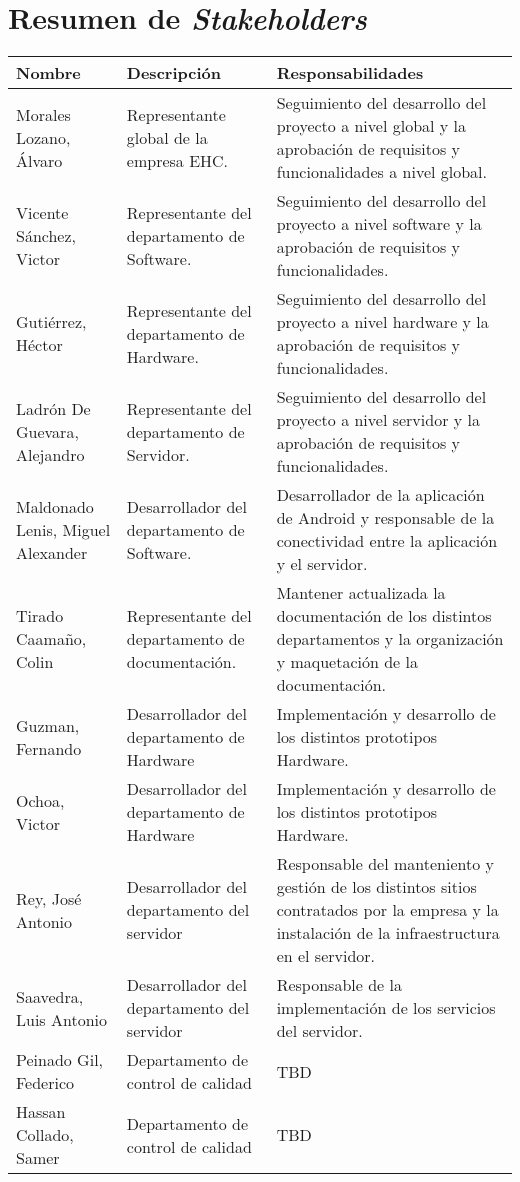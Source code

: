 \section{Resumen de \textit{Stakeholders}}
    \begin{tabular}{|p{4.5cm}|p{4cm}|p{8cm}|}
        \hline \textbf{Nombre} &  \textbf{Descripción} & \textbf{Responsabilidades} \\
        \hline Morales Lozano, Álvaro & Representante global de la empresa EHC. &
		Seguimiento del desarrollo del proyecto a nivel global y la aprobación de requisitos y funcionalidades a nivel global. \\
        \hline Vicente Sánchez, Victor & Representante del departamento de Software. &
        Seguimiento del desarrollo del proyecto a nivel software y la aprobación de requisitos y funcionalidades.\\
        \hline Gutiérrez, Héctor & Representante del departamento de Hardware. &
		Seguimiento del desarrollo del proyecto a nivel hardware y la aprobación de requisitos y funcionalidades. \\
        \hline Ladrón De Guevara, Alejandro & Representante del departamento de Servidor.&
        Seguimiento del desarrollo del proyecto a nivel servidor y la aprobación de requisitos y funcionalidades. \\
        \hline Maldonado Lenis, Miguel Alexander & Desarrollador del departamento de Software. &
		Desarrollador de la aplicación de Android y responsable de la conectividad entre la aplicación y el servidor. \\        
        \hline Tirado Caamaño, Colin & Representante del departamento de documentación. &
		Mantener actualizada la documentación de los distintos departamentos y la organización y maquetación de la documentación. \\  
        \hline Guzman, Fernando & Desarrollador del departamento de Hardware & 
        Implementación y desarrollo de los distintos prototipos Hardware. \\                    
        \hline Ochoa, Victor & Desarrollador del departamento de Hardware &
		Implementación y desarrollo de los distintos prototipos Hardware. \\                            
        \hline Rey, José Antonio & Desarrollador del departamento del servidor &
		Responsable del manteniento y gestión de los distintos sitios contratados por la empresa y la instalación de la infraestructura en el servidor. \\                            
        \hline Saavedra, Luis Antonio & Desarrollador del departamento del servidor &
		Responsable de la implementación de los servicios del servidor. \\
        \hline Peinado Gil, Federico & Departamento de control de calidad &
TBD
		\\		
		\hline Hassan Collado, Samer & Departamento de control de calidad &
		TBD		
		\\		
		\hline                            
    \end{tabular}

